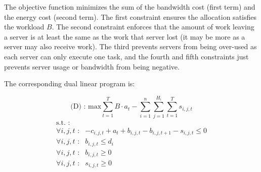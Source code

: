The objective function minimizes the sum of the bandwidth cost (first term) and the energy cost (second term).
The first constraint ensures the allocation satisfies the workload $B$.
The second constraint enforces that the amount of work leaving a server is at least the same as the work that server lost (it may be more as a server may also receive work).
The third prevents servers from being over-used as each server can only execute one task, and the fourth and fifth constraints just prevents server usage or bandwidth from being negative.

The corresponding dual linear program is:

\[
\textrm{(D) : max}   \sum^{T}_{t=1}B \cdot a_t - \sum^{n}_{i=1}\sum^{H_i}_{j=1}\sum^{T}_{t=1}s_{i,j,t}
\]
\[
	\begin{array}{rc}
	\textrm{s.t. :} & \\
		\forall i,j,t \textrm{ :}	    & -c_{i,j,t} + a_t + b_{i,j,t} - b_{i,j,t+1} - s_{i,j,t} \leq 0 \\
		\forall i,j,t \textrm{ :}	    & b_{i,j,t} \leq d_i \\
		\forall i,j,t \textrm{ :}	    & b_{i,j,t} \geq 0 \\
		\forall i,j,t \textrm{ :}	    & s_{i,j,t} \geq 0
	\end{array}
\]






